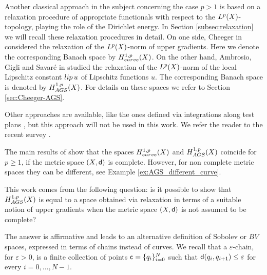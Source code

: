 \documentclass[12pt]{amsart}
\newcommand{\sfd}{{\sf d}}
\newcommand{\X}{{\rm X}}
\newcommand{\lip}{{\rm lip}}
\theoremstyle{definition}
\newcommand{\sfc}{{\sf c}}
\newcommand{\HH}[2]{H^{1,#1}_{{\rm #2}}}
\begin{document}
Another classical approach in the subject concerning the case $p > 1$ is based on a relaxation procedure of appropriate functionals with respect to the $L^p(\X)$-topology, playing the role of the Dirichlet energy. In Section \ref{subsec:relaxation} we will recall these relaxation procedures in detail.
On one side, Cheeger in \cite{Cheeger99} considered the relaxation of the $L^p(\X)$-norm of upper gradients. Here we denote the corresponding Banach space by $\HH{p}{curve}(\X)$. On the other hand, Ambrosio, Gigli and Savar\'{e} in \cite{AmbrosioGigliSavare11-3, AmbrosioGigliSavare14} studied the relaxation of the $L^p(\X)$-norm of the local Lipschitz constant $\lip\,u$ of Lipschitz functions $u$. The corresponding Banach space is denoted by $\HH{p}{AGS}(\X)$. For details on these spaces we refer to Section \ref{sec:Cheeger-AGS}.

Other approaches are available, like the ones defined via integrations along test plans \cite{AmbrosioGigliSavare11-3, AmbrosioGigliSavare14}, but this approach will not be used in this work. We refer the reader to the recent survey \cite{AmbIkoLucPas2024}. 

The main results of \cite{AmbrosioGigliSavare11-3, AmbrosioDiMarino14, Eriksson-Bique-Density-in-energy, LucicPasqualetto2024} show that the spaces $\HH{p}{curve}(\X)$ and $\HH{p}{AGS}(\X)$ coincide for $p\ge 1$, if the metric space $(\X,\sfd)$ is complete. However, for non complete metric spaces they can be different, see Example \ref{ex:AGS_different_curve}.

This work comes from the following question: is it possible to show that $\HH{p}{AGS}(\X)$ is equal to a space obtained via relaxation in terms of a suitable notion of upper gradients when the metric space $(\X,\sfd)$ is not assumed to be complete?

The answer is affirmative and leads to an alternative definition of Sobolev or $BV$ spaces, expressed in terms of chains instead of curves. We recall that a $\varepsilon$-chain, for $\varepsilon > 0$, is a finite collection of points $\sfc = \{q_i\}_{i=0}^N$ such that $\sfd(q_i,q_{i+1})\le \varepsilon$ for every $i=0,\ldots,N-1$.
\end{document}
